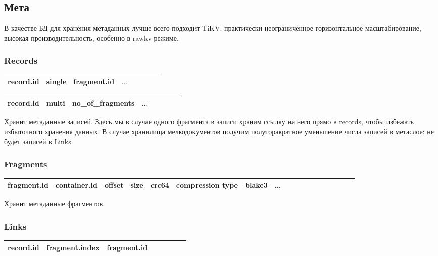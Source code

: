 \documentclass[a4paper,12pt]{article}
\begin{document}
    \subsection{Мета}

    В качестве БД для хранения метаданных лучше всего подходит TiKV: практически неограниченное горизонтальное масштабирование, высокая
    производительность, особенно в rawkv режиме.

    \subsubsection{Records}

    \begin{tabular}{|Sl|Sc|Sc|Sr|}
        \hline
        record.id & single & fragment.id & $\dots$ \\
        \hline
    \end{tabular}

    \bigskip

    \begin{tabular}{|Sl|Sc|Sc|Sr|}
        \hline
        record.id & multi & no\_of\_fragments & $\dots$ \\
        \hline
    \end{tabular}

    \bigskip
    Хранит метаданные записей. Здесь мы в случае одного фрагмента в записи храним ссылку на него прямо в records, чтобы избежать
    избыточного хранения данных. В случае хранилища мелкодокументов получим полуторакратное уменьшение числа записей в метаслое: не будет
    записей в Links.

    \subsubsection{Fragments}

    \begin{tabular}{|Sl|Sc|Sc|Sc|Sc|Sc|Sc|Sc|Sr|}
        \hline
        fragment.id & container.id & offset & size & crc64 & compression type & blake3 & $\dots$ \\
        \hline
    \end{tabular}

    \bigskip
    Хранит метаданные фрагментов.

    \subsubsection{Links}

    \begin{tabular}{|Sl|Sc|Sc|Sr|}
        \hline
        record.id & fragment.index & fragment.id \\
        \hline
    \end{tabular}
\end{document}
